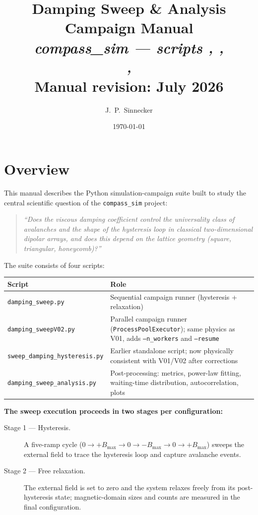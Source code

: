 \documentclass[11pt,a4paper]{article}
\title{\textbf{Damping Sweep \& Analysis Campaign Manual}\\[1ex]
\large\textit{compass\_sim --- scripts \file{damping\_sweep.py},
\file{damping\_sweepV02.py},\\
\file{sweep\_damping\_hysteresis.py},
\file{damping\_sweep\_analysis.py}}\\[1ex]
\normalsize Manual revision: July 2026}
\author{J.~P.~Sinnecker}
\date{\today}
\newcommand{\file}[1]{\texttt{#1}}
\newcommand{\param}[1]{\texttt{--#1}}
\begin{document}
\maketitle
\tableofcontents
\newpage

\section{Overview}
\label{sec:overview}

This manual describes the Python simulation-campaign suite built to study
the central scientific question of the \texttt{compass\_sim} project:

\begin{quote}
\itshape ``Does the viscous damping coefficient control the universality
class of avalanches and the shape of the hysteresis loop in classical
two-dimensional dipolar arrays, and does this depend on the lattice
geometry (square, triangular, honeycomb)?''
\end{quote}

\noindent The suite consists of four scripts:

\begin{center}
\begin{tabular}{lp{10cm}}
\toprule
Script & Role \\
\midrule
\file{damping\_sweep.py} & Sequential campaign runner (hysteresis + relaxation) \\
\file{damping\_sweepV02.py} & Parallel campaign runner (\texttt{ProcessPoolExecutor});
  same physics as V01, adds \param{n\_workers} and \param{resume} \\
\file{sweep\_damping\_hysteresis.py} & Earlier standalone script; now physically
  consistent with V01/V02 after corrections \\
\file{damping\_sweep\_analysis.py} & Post-processing: metrics, power-law fitting,
  waiting-time distribution, autocorrelation, plots \\
\bottomrule
\end{tabular}
\end{center}

\medskip
\textbf{The sweep execution proceeds in two stages per configuration:}
\begin{description}
\item[Stage 1 --- Hysteresis.] A five-ramp cycle
  ($0 \to +B_{\max} \to 0 \to -B_{\max} \to 0 \to +B_{\max}$)
  sweeps the external field to trace the hysteresis loop and capture
  avalanche events.
\item[Stage 2 --- Free relaxation.] The external field is set to zero and the
  system relaxes freely from its post-hysteresis state; magnetic-domain sizes
  and counts are measured in the final configuration.
\end{description}
\end{document}
